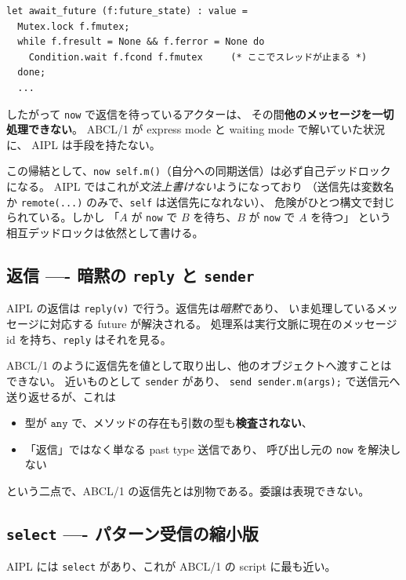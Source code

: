 \documentclass[11pt,a4paper]{ltjsarticle}
\theoremstyle{remark}
\newcommand{\ty}[1]{\ensuremath{\mathtt{#1}}}
\begin{document}
\begin{lstlisting}
let await_future (f:future_state) : value =
  Mutex.lock f.fmutex;
  while f.fresult = None && f.ferror = None do
    Condition.wait f.fcond f.fmutex     (* ここでスレッドが止まる *)
  done;
  ...
\end{lstlisting}

したがって \texttt{now} で返信を待っているアクターは、
その間\textbf{他のメッセージを一切処理できない}。
ABCL/1 が express mode と waiting mode で解いていた状況に、
AIPL は手段を持たない。

この帰結として、\texttt{now self.m()}（自分への同期送信）は必ず自己デッドロックになる。
AIPL ではこれが\emph{文法上書けない}ようになっており
（送信先は変数名か \texttt{remote(...)} のみで、\texttt{self} は送信先になれない）、
危険がひとつ構文で封じられている。しかし
「$A$ が \texttt{now} で $B$ を待ち、$B$ が \texttt{now} で $A$ を待つ」
という相互デッドロックは依然として書ける。

\subsection{返信 ---- 暗黙の \texttt{reply} と \texttt{sender}}

AIPL の返信は \texttt{reply(v)} で行う。返信先は\emph{暗黙}であり、
いま処理しているメッセージに対応する future が解決される。
処理系は実行文脈に現在のメッセージ id を持ち、\texttt{reply} はそれを見る。

ABCL/1 のように返信先を値として取り出し、他のオブジェクトへ渡すことはできない。
近いものとして \texttt{sender} があり、
\texttt{send sender.m(args);} で送信元へ送り返せるが、これは

\begin{itemize}
\item 型が \ty{any} で、メソッドの存在も引数の型も\textbf{検査されない}、
\item 「返信」ではなく単なる past type 送信であり、
  呼び出し元の \texttt{now} を解決しない
\end{itemize}

という二点で、ABCL/1 の返信先とは別物である。委譲は表現できない。

\subsection{\texttt{select} ---- パターン受信の縮小版}

AIPL には \texttt{select} があり、これが ABCL/1 の script に最も近い。
\end{document}
